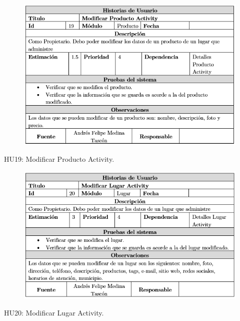 \documentclass[12pt,letterpaper,openany]{book}
\begin{document}
\begin{table}[H]
\begin{center}
\begin{figure}[H]
\begin{center}
\includegraphics[width=13cm]{./imagenes/HU/HU19}
\end{center}
\end{figure}
\end{center}
\caption{HU19: Modificar Producto Activity.}
\end{table}

\begin{table}[H]
\begin{center}
\begin{figure}[H]
\begin{center}
\includegraphics[width=13cm]{./imagenes/HU/HU20}
\end{center}
\end{figure}
\end{center}
\caption{HU20: Modificar Lugar Activity.}
\end{table}
\end{document}
